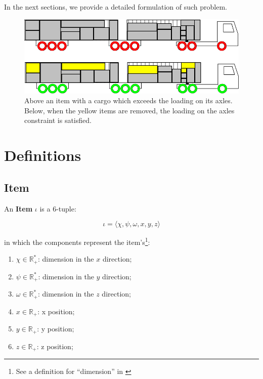 \documentclass{article}
\newcommand{\realnonnegative}{\ensuremath{\mathbb{R}_{+}}\xspace}
\newcommand{\realpositive}{\ensuremath{\mathbb{R}_{+}^{*}}\xspace}
\newcommand{\tuple}[1]{#1-tuple\xspace}
\newcommand{\OrderedSet}[1]{\ensuremath{\langle#1\rangle}\xspace}
\newcommand{\itemO}{\ensuremath{\iota}\xspace}
\newcommand{\lx}{\ensuremath{\chi}\xspace}
\newcommand{\ly}{\ensuremath{\psi}\xspace}
\newcommand{\lz}{\ensuremath{\omega}\xspace}
\newcommand{\px}{\ensuremath{x}\xspace}
\newcommand{\py}{\ensuremath{y}\xspace}
\newcommand{\pz}{\ensuremath{z}\xspace}
\begin{document}
In the next sections, we provide a detailed formulation of such problem.

\begin{figure}
	\centering
	\includegraphics[width=\textwidth]{images/example_remove_items_from_vehicle.png}
	\caption{Above an item with a cargo which exceeds the loading on its axles. Below, when the yellow items are removed, the loading on the axles constraint is satisfied.}
	\label{fig:example remove items}
\end{figure}

\section{Definitions}

\subsection{Item}

An \textbf{Item} \itemO is a \tuple{6}:

\begin{equation}
	\label{definition:item}
	\itemO = \OrderedSet{
		\lx,
		\ly,
		\lz,
		\px,
		\py,
		\pz
	}
\end{equation}

in which the components represent the item's\footnote{See a definition for ``dimension'' in \cite{bib:dict-dimension}}:

\begin{enumerate}
	\item $\lx \in \realpositive$: dimension in the \px direction;
	\item $\ly \in \realpositive$: dimension in the \py direction;
	\item $\lz\in \realpositive$: dimension in the \pz direction;
	\item $\px \in \realnonnegative$: x position;
	\item $\py \in \realnonnegative$: y position;
	\item $\pz \in \realnonnegative$: z position;
\end{enumerate}
\end{document}
